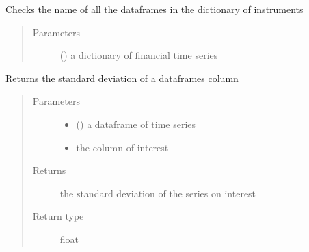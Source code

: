 \documentclass[letterpaper,10pt,english]{sphinxmanual}
\begin{document}

\begin{fulllineitems}
\label{\detokenize{index:Src.utils.check_length}}
Checks the name of all the dataframes in the
dictionary of instruments
\begin{quote}\begin{description}
\item[{Parameters}] \leavevmode
{} () \textendash{} a dictionary of financial time series

\end{description}\end{quote}

\end{fulllineitems}


\begin{fulllineitems}
\label{\detokenize{index:Src.utils.df_std}}
Returns the standard deviation of a dataframes column
\begin{quote}\begin{description}
\item[{Parameters}] \leavevmode\begin{itemize}
\item {} 
 () \textendash{} a dataframe of time series

\item {} 
 \textendash{} the column of interest

\end{itemize}

\item[{Returns}] \leavevmode
the standard deviation of the series on interest

\item[{Return type}] \leavevmode
float

\end{description}\end{quote}

\end{fulllineitems}
\end{document}

